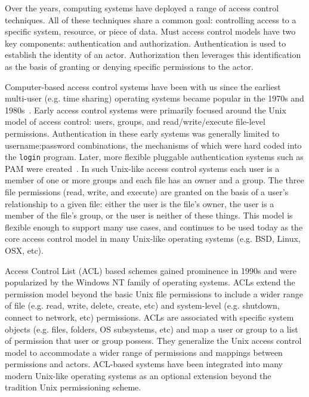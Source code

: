 Over the years, computing systems have deployed a range of access
control techniques. All of these techniques share a common goal:
controlling access to a specific system, resource, or piece of
data. Must access control models have two key components:
authentication and authorization.  Authentication is used to establish
the identity of an actor. Authorization then leverages this
identification as the basis of granting or denying specific
permissions to the actor.

Computer-based access control systems have been with us since the
earliest multi-user (e.g. time sharing) operating systems became
popular in the 1970s and 1980s~\cite{saltzer1974}. Early access
control systems were primarily focused around the Unix model of access
control: users, groups, and read/write/execute file-level
permissions. Authentication in these early systems was generally
limited to username:password combinations, the mechanisms of which
were hard coded into the \texttt{login} program. Later, more flexible
pluggable authentication systems such as PAM were
created~\cite{samar1996, linux-pam, openpam}. In such Unix-like access
control systems each user is a member of one or more groups and each
file has an owner and a group. The three file permissions (read,
write, and execute) are granted on the basis of a user's relationship
to a given file: either the user is the file's owner, the user is a
member of the file's group, or the user is neither of these
things. This model is flexible enough to support many use cases, and
continues to be used today as the core access control model in many
Unix-like operating systems (e.g. BSD, Linux, OSX, etc).

Access Control List (ACL) based schemes gained prominence in 1990s and
were popularized by the Windows NT family of operating systems. ACLs
extend the permission model beyond the basic Unix file permissions to
include a wider range of file (e.g. read, write, delete, create, etc)
and system-level (e.g. shutdown, connect to network, etc)
permissions. ACLs are associated with specific system objects
(e.g. files, folders, OS subsystems, etc) and map a user or group to a
list of permission that user or group possess. They generalize the
Unix access control model to accommodate a wider range of permissions
and mappings between permissions and actors. ACL-based systems have
been integrated into many modern Unix-like operating systems as an
optional extension beyond the tradition Unix permissioning scheme.


